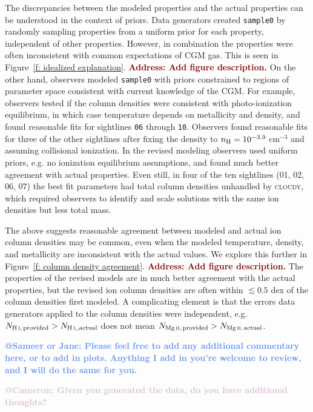\documentclass[fleqn,usenatbib]{mnras}
\makeatletter
\newcommand{\todo}[1]{\textcolor{Maroon}{\textbf{Address: #1}}}
\newcommand{\atsameer}[1]{\textcolor{CornflowerBlue}{\textbf{@Sameer or Jane: #1}}}
\newcommand{\atcameron}[1]{\textcolor{Thistle}{\textbf{@Cameron: #1}}}
\makeatother
\begin{document}
The discrepancies between the modeled properties and the actual properties can be understood in the context of priors.
Data generators created \texttt{sample0} by randomly sampling properties from a uniform prior for each property, independent of other properties.
However, in combination the properties were often inconsistent with common expectations of CGM gas.
This is seen in Figure~\ref{f: idealized explanation}.
\todo{Add figure description.}
On the other hand, observers modeled \texttt{sample0} with priors constrained to regions of parameter space consistent with current knowledge of the CGM.
For example, observers tested if the column densities were consistent with photo-ionization equilibrium, in which case temperature depends on metallicity and density, and found reasonable fits for sightlines \texttt{06} through \texttt{10}.
Observers found reasonable fits for three of the other sightlines after fixing the density to $n_{\rm H} = 10^{-3.9}$ cm$^{-3}$ and assuming collisional ionization.
In the revised modeling observers used uniform priors, e.g. no ionization equilibrium assumptions, and found much better agreement with actual properties.
Even still, in four of the ten sightlines (\textsc{01}, \textsc{02}, \textsc{06}, \textsc{07}) the best fit parameters had total  column densities unhandled by \textsc{cloudy}, which required observers to identify and scale solutions with the same ion densities but less total mass.

The above suggests reasonable agreement between modeled and actual ion column densities may be common, even when the modeled temperature, density, and metallicity are inconsistent with the actual values.
We explore this further in Figure~\ref{f: column density agreement}.
\todo{Add figure description.}
The properties of the revised models are in much better agreement with the actual properties, but the revised ion column densities are often within $\lesssim 0.5$ dex of the column densities first modeled.
A complicating element is that the errors data generators applied to the column densities were independent, e.g. $N_{\ion{H}{I},\,{\rm provided}} > N_{\ion{H}{I},{\rm ,actual}}$ does not mean $N_{\ion{Mg}{II},\,{\rm provided}} > N_{\ion{Mg}{II},\,{\rm actual}}$.

\atsameer{
Please feel free to add any additional commentary here, or to add in plots.
Anything I add in you're welcome to review, and I will do the same for you.
}

\atcameron{Given you generated the data, do you have additional thoughts?}
\end{document}
